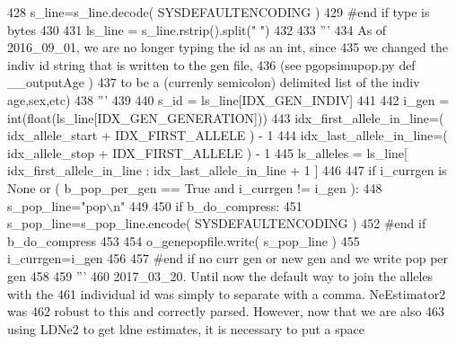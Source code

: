 \begin{DoxyCode}
428 \textcolor{stringliteral}{                s\_line=s\_line.decode( SYSDEFAULTENCODING )}
429 \textcolor{stringliteral}{            #end if type is bytes}
430 \textcolor{stringliteral}{}
431 \textcolor{stringliteral}{            ls\_line = s\_line.rstrip().split(" ") }
432 \textcolor{stringliteral}{}
433 \textcolor{stringliteral}{            '''}
434             As of 2016\_09\_01, we are no longer typing the id \textcolor{keyword}{as} an int, since
435             we changed the indiv id string that \textcolor{keywordflow}{is} written to the gen file,
436             (see pgopsimupop.py \textcolor{keyword}{def }\_\_outputAge )
437             to be a (currenly semicolon) delimited list of the indiv age,sex,etc)
438             \textcolor{stringliteral}{'''}
439 \textcolor{stringliteral}{            }
440 \textcolor{stringliteral}{            s\_id = ls\_line[IDX\_GEN\_INDIV]}
441 \textcolor{stringliteral}{}
442 \textcolor{stringliteral}{            i\_gen = int(float(ls\_line[IDX\_GEN\_GENERATION]))}
443 \textcolor{stringliteral}{            idx\_first\_allele\_in\_line=( idx\_allele\_start + IDX\_FIRST\_ALLELE ) - 1}
444 \textcolor{stringliteral}{            idx\_last\_allele\_in\_line=( idx\_allele\_stop  + IDX\_FIRST\_ALLELE ) - 1 }
445 \textcolor{stringliteral}{            ls\_alleles = ls\_line[ idx\_first\_allele\_in\_line : idx\_last\_allele\_in\_line + 1 ]}
446 \textcolor{stringliteral}{}
447 \textcolor{stringliteral}{            if i\_currgen is None or ( b\_pop\_per\_gen == True and i\_currgen != i\_gen ):}
448 \textcolor{stringliteral}{                s\_pop\_line="pop\(\backslash\)n"}
449 \textcolor{stringliteral}{}
450 \textcolor{stringliteral}{                if b\_do\_compress:}
451 \textcolor{stringliteral}{                        s\_pop\_line=s\_pop\_line.encode( SYSDEFAULTENCODING )}
452 \textcolor{stringliteral}{                #end if b\_do\_compress}
453 \textcolor{stringliteral}{}
454 \textcolor{stringliteral}{                o\_genepopfile.write( s\_pop\_line )}
455 \textcolor{stringliteral}{                i\_currgen=i\_gen}
456 \textcolor{stringliteral}{}
457 \textcolor{stringliteral}{            #end if no curr gen or new gen and we write pop per gen}
458 \textcolor{stringliteral}{            }
459 \textcolor{stringliteral}{            '''}
460             2017\_03\_20.  Until now the default way to join the alleles with the
461             individual id was simply to separate with a comma.  NeEstimator2 was
462             robust to this \textcolor{keywordflow}{and} correctly parsed.  However, now that we are also
463             using LDNe2 to get ldne estimates, it \textcolor{keywordflow}{is} necessary to put a space

\end{DoxyCode}
